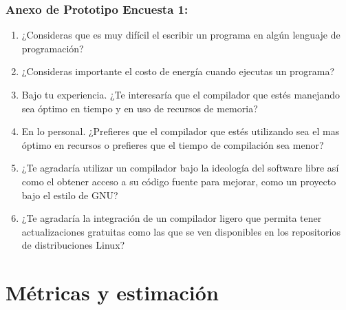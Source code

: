 \documentclass[10pt,executivepaper]{article}
\begin{document}
\subsubsection{Anexo de Prototipo Encuesta 1:}
\begin{enumerate}
    \item ¿Consideras que es muy difícil el escribir un programa en algún lenguaje de programación?
    \item ¿Consideras importante el costo de energía cuando ejecutas un programa?
    \item Bajo tu experiencia. ¿Te interesaría que el compilador que estés manejando sea óptimo en tiempo y en uso de recursos de memoria?
    \item En lo personal. ¿Prefieres que el compilador que estés utilizando sea el mas óptimo en recursos o prefieres que el tiempo de compilación sea menor?
    \item ¿Te agradaría utilizar un compilador bajo la ideología del software libre así como el obtener acceso a su código fuente para mejorar, como un proyecto bajo el estilo de GNU?
    \item ¿Te agradaría la integración de un compilador ligero que permita tener actualizaciones gratuitas como las que se ven disponibles en los repositorios de distribuciones Linux?
\end{enumerate}
\section{Métricas y estimación}
\end{document}
